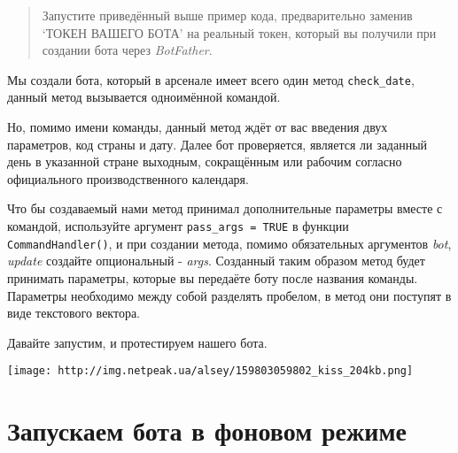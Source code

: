 \documentclass[
]{book}
\newenvironment{Shaded}{\begin{snugshade}}{\end{snugshade}}
\newcommand{\AttributeTok}[1]{\textcolor[rgb]{0.77,0.63,0.00}{#1}}
\newcommand{\CommentTok}[1]{\textcolor[rgb]{0.56,0.35,0.01}{\textit{#1}}}
\newcommand{\ConstantTok}[1]{\textcolor[rgb]{0.00,0.00,0.00}{#1}}
\newcommand{\FunctionTok}[1]{\textcolor[rgb]{0.00,0.00,0.00}{#1}}
\newcommand{\NormalTok}[1]{#1}
\newcommand{\OtherTok}[1]{\textcolor[rgb]{0.56,0.35,0.01}{#1}}
\newcommand{\SpecialCharTok}[1]{\textcolor[rgb]{0.00,0.00,0.00}{#1}}
\newcommand{\StringTok}[1]{\textcolor[rgb]{0.31,0.60,0.02}{#1}}
\begin{document}
\begin{Shaded}
\end{Shaded}

\begin{quote}
Запустите приведённый выше пример кода, предварительно заменив `ТОКЕН ВАШЕГО БОТА' на реальный токен, который вы получили при создании бота через \emph{BotFather}.
\end{quote}

Мы создали бота, который в арсенале имеет всего один метод \texttt{check\_date}, данный метод вызывается одноимённой командой.

Но, помимо имени команды, данный метод ждёт от вас введения двух параметров, код страны и дату. Далее бот проверяется, является ли заданный день в указанной стране выходным, сокращённым или рабочим согласно официального производственного календаря.

Что бы создаваемый нами метод принимал дополнительные параметры вместе с командой, используйте аргумент \texttt{pass\_args\ =\ TRUE} в функции \texttt{CommandHandler()}, и при создании метода, помимо обязательных аргументов \emph{bot}, \emph{update} создайте опциональный - \emph{args}. Созданный таким образом метод будет принимать параметры, которые вы передаёте боту после названия команды. Параметры необходимо между собой разделять пробелом, в метод они поступят в виде текстового вектора.

Давайте запустим, и протестируем нашего бота.

\texttt{[image: http://img.netpeak.ua/alsey/159803059802\_kiss\_204kb.png]}

\hypertarget{ux437ux430ux43fux443ux441ux43aux430ux435ux43c-ux431ux43eux442ux430-ux432-ux444ux43eux43dux43eux432ux43eux43c-ux440ux435ux436ux438ux43cux435}{%
\section{Запускаем бота в фоновом режиме}\label{ux437ux430ux43fux443ux441ux43aux430ux435ux43c-ux431ux43eux442ux430-ux432-ux444ux43eux43dux43eux432ux43eux43c-ux440ux435ux436ux438ux43cux435}}
\end{document}
